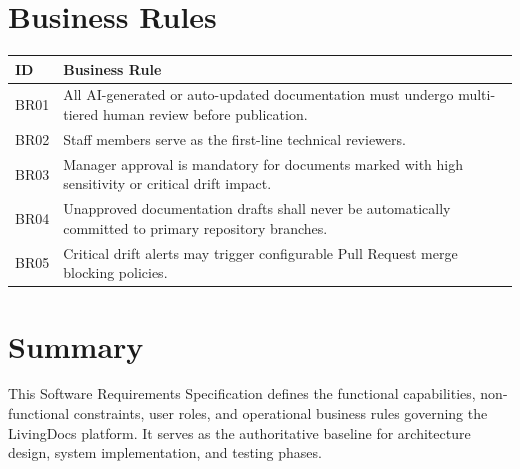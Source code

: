 \section{Business Rules}
\begin{longtable}{p{2cm} p{11.3cm}}
	\toprule
	\textbf{ID} & \textbf{Business Rule} \\
	\midrule
	\endhead
	BR01 & All AI-generated or auto-updated documentation must undergo multi-tiered human review before publication. \\
	BR02 & Staff members serve as the first-line technical reviewers. \\
	BR03 & Manager approval is mandatory for documents marked with high sensitivity or critical drift impact. \\
	BR04 & Unapproved documentation drafts shall never be automatically committed to primary repository branches. \\
	BR05 & Critical drift alerts may trigger configurable Pull Request merge blocking policies. \\
	\bottomrule
\end{longtable}

\section{Summary}
This Software Requirements Specification defines the functional capabilities, non-functional constraints, user roles, and operational business rules governing the LivingDocs platform. It serves as the authoritative baseline for architecture design, system implementation, and testing phases.
